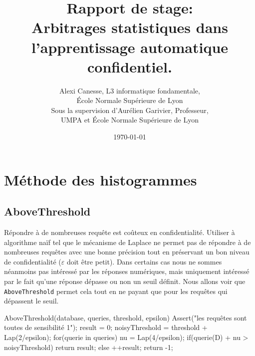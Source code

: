 

\usepackage{tkz-base}
\usepackage{algorithm}
\usepackage{algorithmic}
\setlength\parindent{0pt}





\title{Rapport de stage:\\
Arbitrages statistiques dans l'apprentissage automatique confidentiel.
}           
\author{{\sc Alexi Canesse}, L3 informatique fondamentale,\\École Normale Supérieure de Lyon\\
Sous la supervision d'{\sc Aurélien Garivier}, Professeur,\\ UMPA et École Normale Supérieure de Lyon}
\date{\today}          

\sloppy                  

\pgfplotsset{compat=1.16}






\maketitle
\newpage

\section{Méthode des histogrammes}

\subsection{AboveThreshold}

Répondre à de nombreuses requête est coûteux en confidentialité. Utiliser à algorithme naïf tel que le mécanisme de {\sc Laplace} ne permet pas de répondre à de nombreuses requêtes avec une bonne précision tout en préservant un bon niveau de confidentialité (\(\varepsilon\) doit être petit). Dans certains cas nous ne sommes néanmoins pas intéressé par les réponses numériques, mais uniquement intéressé par le fait qu'une réponse dépasse ou non un seuil définit. Nous allons voir que \texttt{AboveThreshold} permet cela tout en ne payant que pour les requêtes qui dépassent le seuil.

\label{AboveThreshold}
\begin{code}
    AboveThreshold(database, queries, threshold, epsilon){
        Assert("les requêtes sont toutes de sensibilité 1");
        result = 0;
        noisyThreshold = threshold + Lap(2/epsilon);
        for(querie in queries){
            nu = Lap(4/epsilon);
            if(querie(D) + nu > noisyThreshold)
                return result;
            else
                ++result;
        }
        return -1;
    }
\end{code}

